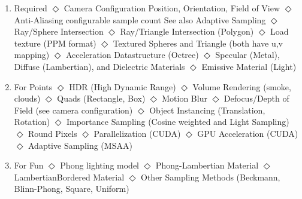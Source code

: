 \documentclass{article}
\def\sitem{\subitem $\Diamond$ }
\let\ssitem\subsubitem
\begin{document}
\begin{enumerate}[\quad]
    \item Required 
        \sitem Camera Configuration
            \ssitem Position, Orientation, Field of View
        \sitem Anti-Aliasing
            \ssitem configurable sample count 
            \ssitem See also Adaptive Sampling
        \sitem Ray/Sphere Intersection
        \sitem Ray/Triangle Intersection (Polygon)
        \sitem Load texture (PPM format)
        \sitem Textured Spheres and Triangle (both have u,v mapping)
        \sitem Acceleration Datastructure (Octree)
        \sitem Specular (Metal), Diffuse (Lambertian), and Dielectric Materials 
        \sitem Emissive Material (Light)
    \item For Points
        \sitem HDR (High Dynamic Range) 
        \sitem Volume Rendering (smoke, clouds)
        \sitem Quads (Rectangle, Box)
        \sitem Motion Blur 
        \sitem Defocus/Depth of Field (see camera configuration)
        \sitem Object Instancing (Translation, Rotation)
        \sitem Importance Sampling (Cosine weighted and Light Sampling)
        \sitem Round Pixels 
        \sitem Parallelization (CUDA)
        \sitem GPU Acceleration (CUDA)
        \sitem Adaptive Sampling (MSAA)   
    \item For Fun
        \sitem Phong lighting model 
        \sitem Phong-Lambertian Material
        \sitem LambertianBordered Material
        \sitem Other Sampling Methods (Beckmann, Blinn-Phong, Square, Uniform)   

\end{enumerate}
\end{document}
